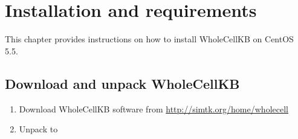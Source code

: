 \documentclass[twoside]{book}
\makeatletter
\def\cleardoublepage{\clearpage\if@twoside \ifodd\c@page\else
		\thispagestyle{empty}\hbox{}\newpage\if@twocolumn\hbox{}\newpage\fi\fi\fi}
\def\cleardoublepage{\clearpage}
\makeatother
\begin{document}
\cleardoublepage
\pagestyle{plain}

\tableofcontents

\cleardoublepage
\mainmatter

\chapter{Installation and requirements}
This chapter provides instructions on how to install WholeCellKB on CentOS 5.5.

\section{Download and unpack WholeCellKB}
\begin{enumerate}
\item Download WholeCellKB software from \url{http://simtk.org/home/wholecell}
\item Unpack to 
\end{enumerate}
\end{document}
